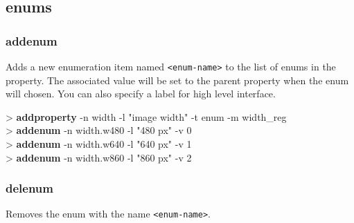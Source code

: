 \documentclass[10pt,a4paper]{article}
\begin{document}
{\subsection{enums}
\subsubsection{addenum}
\label{subsec:addenum}

Adds a new enumeration item named \texttt{<enum-name>} to the list of enums in the property. The associated value will be set to the parent property when the enum will chosen. You can also specify a label for high level interface.\\


\begin{sampletitle}
> \textbf{\tool{} addproperty} -n width -l "image width" -t enum -m width\_reg \\
> \textbf{\tool{} addenum} -n width.w480 -l "480 px" -v 0 \\
> \textbf{\tool{} addenum} -n width.w640 -l "640 px" -v 1 \\
> \textbf{\tool{} addenum} -n width.w860 -l "860 px" -v 2
\end{sampletitle}


\subsubsection{delenum}
\label{subsec:delenum}

Removes the enum with the name \texttt{<enum-name>}.\\


}
\end{document}
